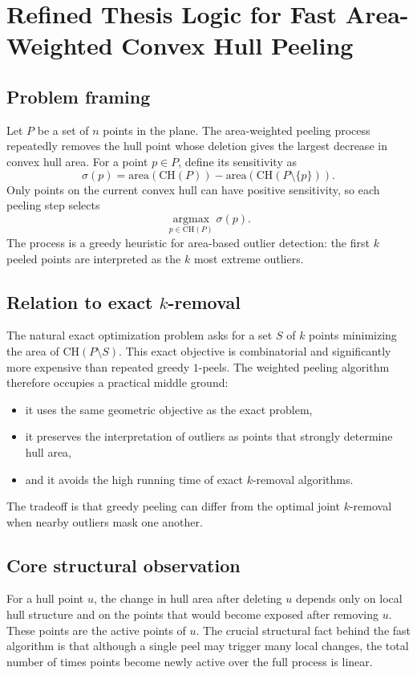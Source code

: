 \section*{Refined Thesis Logic for Fast Area-Weighted Convex Hull Peeling}

\subsection*{Problem framing}
Let $P$ be a set of $n$ points in the plane. The area-weighted peeling process repeatedly removes the hull point whose deletion gives the largest decrease in convex hull area. For a point $p \in P$, define its sensitivity as
\[
\sigma(p) = \mathrm{area}(\mathrm{CH}(P)) - \mathrm{area}(\mathrm{CH}(P \setminus \{p\})).
\]
Only points on the current convex hull can have positive sensitivity, so each peeling step selects
\[
\operatorname*{argmax}_{p \in \mathrm{CH}(P)} \sigma(p).
\]
The process is a greedy heuristic for area-based outlier detection: the first $k$ peeled points are interpreted as the $k$ most extreme outliers.

\subsection*{Relation to exact $k$-removal}
The natural exact optimization problem asks for a set $S$ of $k$ points minimizing the area of $\mathrm{CH}(P \setminus S)$. This exact objective is combinatorial and significantly more expensive than repeated greedy $1$-peels. The weighted peeling algorithm therefore occupies a practical middle ground:
\begin{itemize}
    \item it uses the same geometric objective as the exact problem,
    \item it preserves the interpretation of outliers as points that strongly determine hull area,
    \item and it avoids the high running time of exact $k$-removal algorithms.
\end{itemize}
The tradeoff is that greedy peeling can differ from the optimal joint $k$-removal when nearby outliers mask one another.

\subsection*{Core structural observation}
For a hull point $u$, the change in hull area after deleting $u$ depends only on local hull structure and on the points that would become exposed after removing $u$. These points are the active points of $u$. The crucial structural fact behind the fast algorithm is that although a single peel may trigger many local changes, the total number of times points become newly active over the full process is linear.

